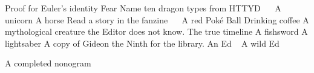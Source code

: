 \begin{multicols}{2}
\begin{small}
\begin{tabbing}
            {Proof for Euler's identity}
            {Fear}
        {Name ten dragon types from HTTYD ~\FD ~\M}
            {A unicorn}
         {A horse}
        {Read a story in the fanzine ~\FD ~\E}
        {A red Poké Ball}
        {Drinking coffee}
        {A mythological creature the Editor does not know.}
          {The true timeline}
          {A fishsword}
       {A lightsaber}
       {A copy of Gideon the Ninth for the library.}
            {An Ed ~\E}
            {A wild Ed ~\E ~\FD}
       
          {A completed nonogram}
    \end{tabbing}
  \end{small}
\end{multicols}

\vfill

\begin{center}
\end{center}

\vfill

